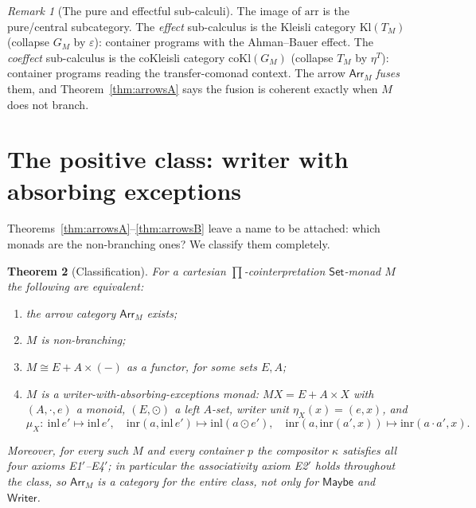\documentclass[11pt]{amsart}
\theoremstyle{plain}
\newtheorem{theorem}{Theorem}[section]
\theoremstyle{definition}
\theoremstyle{remark}
\newtheorem{remark}[theorem]{Remark}
\newcommand{\Set}{\mathsf{Set}}
\newcommand{\Kl}{\mathrm{Kl}}
\newcommand{\coKl}{\mathrm{coKl}}
\newcommand{\arr}{\mathrm{arr}}
\newcommand{\Maybe}{\mathsf{Maybe}}
\newcommand{\Writer}{\mathsf{Writer}}
\newcommand{\Arr}{\mathsf{Arr}}
\begin{document}
\begin{remark}[The pure and effectful sub-calculi]
The image of $\arr$ is the pure/central subcategory. The \emph{effect} sub-calculus is the
Kleisli category $\Kl(T_M)$ (collapse $G_M$ by $\varepsilon$): container programs with the
Ahman--Bauer effect. The \emph{coeffect} sub-calculus is the coKleisli category $\coKl(G_M)$
(collapse $T_M$ by $\eta^T$): container programs reading the transfer-comonad context. The
arrow $\Arr_M$ \emph{fuses} them, and Theorem~\ref{thm:arrowsA} says the fusion is coherent
exactly when $M$ does not branch.
\end{remark}

\section{The positive class: writer with absorbing exceptions}\label{sec:classify}

Theorems~\ref{thm:arrowsA}--\ref{thm:arrowsB} leave a name to be attached: which monads are
the non-branching ones? We classify them completely.

\begin{theorem}[Classification]\label{thm:classify}
For a cartesian $\prod$-cointerpretation $\Set$-monad $M$ the following are equivalent:
\begin{enumerate}
  \item the arrow category $\Arr_M$ exists;
  \item $M$ is non-branching;
  \item $M\cong E + A\times(-)$ as a functor, for some sets $E,A$;
  \item $M$ is a \emph{writer-with-absorbing-exceptions} monad: $MX = E + A\times X$ with
  $(A,\cdot,e)$ a monoid, $(E,\odot)$ a left $A$-set, writer unit $\eta_X(x)=(e,x)$, and
  \[
    \mu_X\colon\ \mathrm{inl}\,e'\mapsto\mathrm{inl}\,e',\quad
    \mathrm{inr}(a,\mathrm{inl}\,e')\mapsto\mathrm{inl}(a\odot e'),\quad
    \mathrm{inr}(a,\mathrm{inr}(a',x))\mapsto\mathrm{inr}(a\cdot a',x).
  \]
\end{enumerate}
Moreover, for every such $M$ and every container $p$ the compositor $\kappa$ satisfies all
four axioms E1$'$--E4$'$; in particular the associativity axiom E2$'$ holds throughout the
class, so $\Arr_M$ is a category for the entire class, not only for $\Maybe$ and $\Writer$.
\end{theorem}
\end{document}
